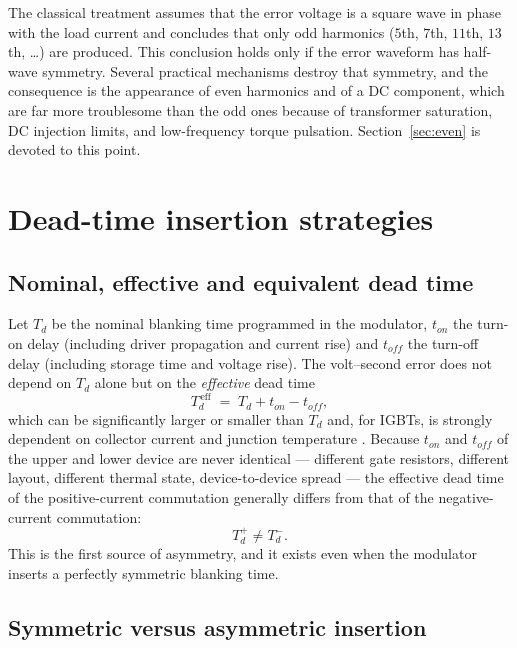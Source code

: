 \documentclass[11pt,a4paper]{article}
\begin{document}
The classical treatment assumes that the error voltage is a square wave in phase with the
load current and concludes that only odd harmonics ($5$th, $7$th, $11$th, $13$th, \dots)
are produced. This conclusion holds only if the error waveform has half-wave symmetry.
Several practical mechanisms destroy that symmetry, and the consequence is the appearance
of even harmonics and of a DC component, which are far more troublesome than the odd ones
because of transformer saturation, DC injection limits, and low-frequency torque
pulsation. Section~\ref{sec:even} is devoted to this point.

\section{Dead-time insertion strategies}

\subsection{Nominal, effective and equivalent dead time}

Let $T_d$ be the nominal blanking time programmed in the modulator, $t_{on}$ the turn-on
delay (including driver propagation and current rise) and $t_{off}$ the turn-off delay
(including storage time and voltage rise). The volt--second error does not depend on
$T_d$ alone but on the \emph{effective} dead time
\begin{equation}
T_{d}^{\,\mathrm{eff}} \;=\; T_d + t_{on} - t_{off} ,
\label{eq:teff}
\end{equation}
which can be significantly larger or smaller than $T_d$ and, for IGBTs, is strongly
dependent on collector current and junction temperature
\cite{jeong1991,choi1996,munoz1999,bedetti2015}. Because $t_{on}$ and $t_{off}$ of the
upper and lower device are never identical --- different gate resistors, different layout,
different thermal state, device-to-device spread --- the effective dead time of the
positive-current commutation generally differs from that of the negative-current
commutation:
\begin{equation}
T_{d}^{+} \neq T_{d}^{-} .
\end{equation}
This is the first source of asymmetry, and it exists even when the modulator inserts a
perfectly symmetric blanking time.

\subsection{Symmetric versus asymmetric insertion}
\end{document}
